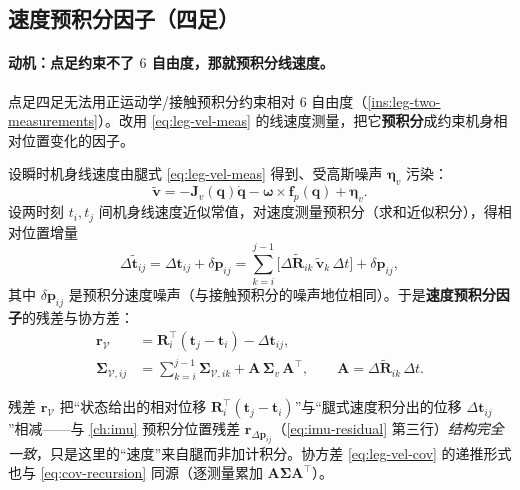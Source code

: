 \subsection{速度预积分因子（四足）}
\label{subsec:leg-vel-preint}

\paragraph{动机：点足约束不了 $6$ 自由度，那就预积分线速度。}
点足四足无法用正运动学/接触预积分约束相对 $6$ 自由度（\cref{ins:leg-two-measurements}）。改用 \cref{eq:leg-vel-meas} 的线速度测量，把它\textbf{预积分}成约束机身相对位置变化的因子\cite{wisth2023vilens}。

\begin{derivation}[速度预积分残差]
设瞬时机身线速度由腿式 \cref{eq:leg-vel-meas} 得到、受高斯噪声 $\boldsymbol{\eta}_v$ 污染：
\begin{equation}
  \tilde{\mathbf{v}}=-\mathbf{J}_v(\mathbf{q})\dot{\mathbf{q}}-\boldsymbol{\omega}\times\mathbf{f}_p(\mathbf{q})+\boldsymbol{\eta}_v.
  \label{eq:leg-vel-noisy}
\end{equation}
设两时刻 $t_i,t_j$ 间机身线速度近似常值，对速度测量预积分（求和近似积分），得相对位置增量
\begin{equation}
  \Delta\tilde{\mathbf{t}}_{ij}=\Delta\mathbf{t}_{ij}+\delta\mathbf{p}_{ij}=\sum_{k=i}^{j-1}\big[\Delta\tilde{\mathbf{R}}_{ik}\,\tilde{\mathbf{v}}_k\,\Delta t\big]+\delta\mathbf{p}_{ij},
  \label{eq:leg-vel-sum}
\end{equation}
其中 $\delta\mathbf{p}_{ij}$ 是预积分速度噪声（与接触预积分的噪声地位相同）。于是\textbf{速度预积分因子}的残差与协方差：
\begin{align}
  \mathbf{r}_{\mathcal{V}}&=\mathbf{R}_i^\top(\mathbf{t}_j-\mathbf{t}_i)-\Delta\mathbf{t}_{ij},\label{eq:leg-vel-residual}\\
  \boldsymbol{\Sigma}_{\mathcal{V},ij}&=\sum_{k=i}^{j-1}\boldsymbol{\Sigma}_{\mathcal{V},ik}+\mathbf{A}\,\boldsymbol{\Sigma}_v\,\mathbf{A}^\top,\qquad \mathbf{A}=\Delta\tilde{\mathbf{R}}_{ik}\,\Delta t.\label{eq:leg-vel-cov}
\end{align}
\end{derivation}
残差 $\mathbf{r}_{\mathcal{V}}$ 把“状态给出的相对位移 $\mathbf{R}_i^\top(\mathbf{t}_j-\mathbf{t}_i)$”与“腿式速度积分出的位移 $\Delta\mathbf{t}_{ij}$”相减——与 \cref{ch:imu} 预积分位置残差 $\mathbf{r}_{\Delta\mathbf{p}_{ij}}$（\cref{eq:imu-residual} 第三行）\emph{结构完全一致}，只是这里的“速度”来自腿而非加计积分。协方差 \cref{eq:leg-vel-cov} 的递推形式也与 \cref{eq:cov-recursion} 同源（逐测量累加 $\mathbf{A}\boldsymbol{\Sigma}\mathbf{A}^\top$）。

